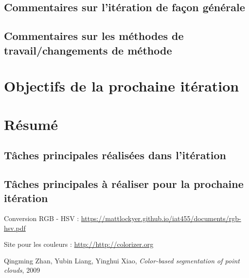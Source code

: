 \documentclass[12pt,titlepage,french]{article}
\begin{document}
\subsection{Commentaires sur l'itération de façon générale}



\subsection{Commentaires sur les méthodes de travail/changements de méthode}


\section{Objectifs de la prochaine itération}




\section{Résumé}
\subsection{Tâches principales réalisées dans l'itération}

\subsection{Tâches principales à réaliser pour la prochaine itération}

\begin{thebibliography}{3}

 Conversion RGB - HSV : \newline
\url{https://mattlockyer.github.io/iat455/documents/rgb-hsv.pdf}

 Site pour les couleurs : \newline
\url{http://http://colorizer.org}

 Qingming Zhan, Yubin Liang, Yinghui Xiao, \textit{Color-based segmentation of point clouds}, 2009
\end{thebibliography}
\end{document}
